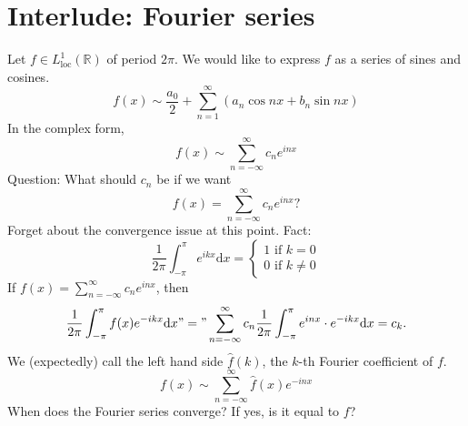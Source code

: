 \documentclass{article}
\theoremstyle{definition}
\begin{document}
\section*{Interlude: Fourier series}

Let $f \in L_{\text{loc}}^1( \mathbb{R})$ of period $2 \pi$.
We would like to express $f$ as a series of sines and cosines.
\[
	f(x) \sim \frac{a_0}{2} + \sum_{n = 1}^\infty (a_n \cos nx + b_n \sin nx)
\]
In the complex form, 
\[
	f(x) \sim \sum_{n =- \infty}^\infty c_n e^{inx}
\]
Question: What should $c_n$ be if we want
\[
	f(x) = \sum_{n = -\infty}^\infty c_n e^{inx}?
\]
Forget about the convergence issue at this point.
Fact: 
\[
	\frac{1}{2 \pi} \int_{- \pi}^\pi e^{ikx} \mathrm{d} x = 
	\begin{cases}
		1 \text{ if } k = 0\\
		0 \text{ if } k \neq 0
	\end{cases}
\]
If $f(x) = \sum_{n = -\infty}^\infty c_n e^{inx}$, then
\[
	\frac{1}{2 \pi}\int_{- \pi}^\pi f(x) e^{-ikx} \mathrm{d} x "=" \sum_{n = -\infty}^\infty c_n \frac{1}{2 \pi} \int_{- \pi}^\pi e^{inx} \cdot e^{-ikx} \mathrm{d} x = c_k.
\]
We (expectedly) call the left hand side $\hat{f}(k)$, the $k$-th Fourier coefficient of $f$.
\[
	f(x) \sim \sum_{n = -\infty}^\infty \hat{f}(x) e^{-inx}
\]
When does the Fourier series converge?
If yes, is it equal to $f$?
\end{document}
